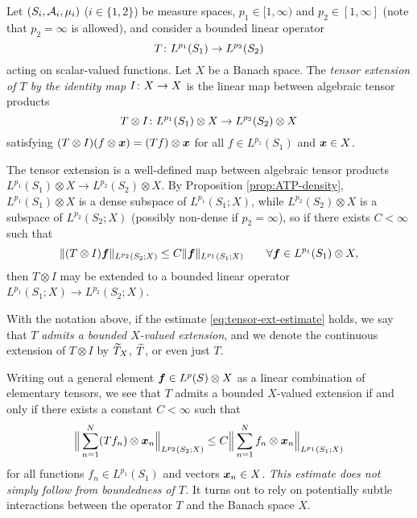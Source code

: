 \begin{defn}\label{defn:tensor-exts}
  Let $(S_i,\mathcal{A}_i,\mu_i)$ ($i \in \{1,2\}$) be measure spaces, $p_1 \in [1,\infty)$ and $p_2 \in [1,\infty]$ (note that $p_{2} = \infty$ is allowed), and consider a bounded linear operator
  \begin{equation*}
    T \colon L^{p_1}(S_{1}) \rightarrow L^{p_2}(S_{2})
  \end{equation*}
  acting on scalar-valued functions.
  Let $X$ be a Banach space.
  The \emph{tensor extension of $T$ by the identity map $I \colon X \rightarrow X$} is the linear map between algebraic tensor products
  \begin{equation*}
    T \otimes I \colon L^{p_1}(S_1) \otimes X \rightarrow L^{p_2}(S_2) \otimes X
  \end{equation*}
  satisfying $(T \otimes I)(f \otimes \bm{x}) = (Tf) \otimes \bm{x}$ for all $f \in L^{p_1}(S_1)$ and $\bm{x} \in X$.
\end{defn}

The tensor extension is a well-defined map between algebraic tensor products $L^{p_1}(S_1) \otimes X \to L^{p_2}(S_2) \otimes X$.
By Proposition \ref{prop:ATP-density}, $L^{p_1}(S_1) \otimes X$ is a dense subspace of $L^{p_1}(S_1;X)$, while $L^{p_2}(S_2) \otimes X$ is a subspace of $L^{p_2}(S_2;X)$ (possibly non-dense if $p_2 = \infty$), so if there exists $C < \infty$ such that
\begin{equation}\label{eq:tensor-ext-estimate}
  \|(T \otimes I)\bm{f}\|_{L^{p_2}(S_2;X)} \leq C \|\bm{f}\|_{L^{p_1}(S_1;X)} \qquad \forall \bm{f} \in L^{p_1}(S_1) \otimes X,
\end{equation}
then $T \otimes I$ may be extended to a bounded linear operator $L^{p_1}(S_1;X) \to L^{p_2}(S_2;X)$.

\begin{defn}
  With the notation above, if the estimate \eqref{eq:tensor-ext-estimate} holds, we say that $T$ \emph{admits a bounded $X$-valued extension}, and we denote the continuous extension of $T \otimes I$ by $\widetilde{T}_X$, $\widetilde{T}$, or even just $T$.
\end{defn}
Writing out a general element $\bm{f} \in L^p(S) \otimes X$ as a linear combination of elementary tensors, we see that $T$ admits a bounded $X$-valued extension if and only if there exists a constant $C < \infty$ such that
\begin{equation}\label{eq:tensor-ext-estimate-full}
  \Big\|\sum_{n=1}^N (Tf_n) \otimes \bm{x}_n\Big\|_{L^{p_2}(S_2;X)} \leq C \Big\|\sum_{n=1}^N f_n \otimes \bm{x}_n\Big\|_{L^{p_1}(S_1;X)}
\end{equation}
for all functions $f_n \in L^{p_1}(S_1)$ and vectors $\bm{x}_n \in X$.
\emph{This estimate does not simply follow from boundedness of $T$.}
It turns out to rely on potentially subtle interactions between the operator $T$ and the Banach space $X$.

